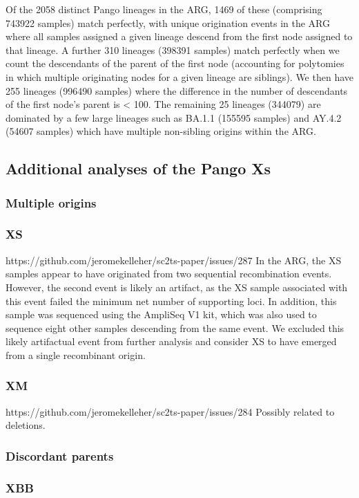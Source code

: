 \documentclass[12pt,letterpaper]{article}
\begin{document}
Of the 2058 distinct Pango lineages in the ARG,
1469 of these (comprising 743922 samples) match perfectly,
with unique origination events in the ARG
where all samples assigned a given lineage descend from the first node assigned to that lineage.
A further 310 lineages (398391 samples) match perfectly
when we count the descendants of the parent of the first node
(accounting for polytomies in which multiple originating nodes for a given lineage are siblings).
We then have 255 lineages (996490 samples)
where the difference in the number of descendants of the first node's parent is < 100.
The remaining 25 lineages (344079) are dominated by a few large lineages such as BA.1.1 (155595 samples) and AY.4.2 (54607 samples)
which have multiple non-sibling origins within the ARG.

\subsection*{Additional analyses of the Pango Xs}
\subsubsection*{Multiple origins}
\subsubsection*{XS}
https://github.com/jeromekelleher/sc2ts-paper/issues/287
In the ARG, the XS samples appear to have originated from two sequential recombination events.
However, the second event is likely an artifact,
as the XS sample associated with this event failed the minimum net number of supporting loci.
In addition, this sample was sequenced using the AmpliSeq V1 kit,
which was also used to sequence eight other samples descending from the same event.
We excluded this likely artifactual event from further analysis and
consider XS to have emerged from a single recombinant origin.

\subsubsection*{XM}
https://github.com/jeromekelleher/sc2ts-paper/issues/284
Possibly related to deletions.

\subsubsection*{Discordant parents}
\subsubsection*{XBB}
\end{document}
